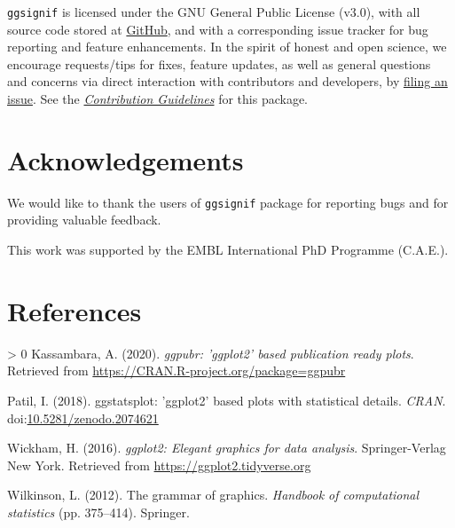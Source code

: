 \documentclass{article}
\newlength{\cslhangindent}
\newenvironment{CSLReferences}[3] %
 {%
  \setlength{\parindent}{0pt}
  \ifodd #1 \everypar{\setlength{\hangindent}{\cslhangindent}}\ignorespaces\fi
  \ifnum #2 > 0
  \setlength{\parskip}{#2\baselineskip}
  \fi
 }%
 {}
\begin{document}
\texttt{ggsignif} is licensed under the GNU General Public License
(v3.0), with all source code stored at
\href{https://github.com/const-ae/ggsignif}{GitHub}, and with a
corresponding issue tracker for bug reporting and feature enhancements.
In the spirit of honest and open science, we encourage requests/tips for
fixes, feature updates, as well as general questions and concerns via
direct interaction with contributors and developers, by
\href{https://github.com/const-ae/ggsignif/issues}{filing an issue}. See
the
\href{https://github.com/const-ae/ggsignif/blob/master/CODE_OF_CONDUCT.md}{\emph{Contribution
Guidelines}} for this package.

\hypertarget{acknowledgements}{%
\section{Acknowledgements}\label{acknowledgements}}

We would like to thank the users of \texttt{ggsignif} package for
reporting bugs and for providing valuable feedback.

This work was supported by the EMBL International PhD Programme
(C.A.E.).

\hypertarget{references}{%
\section*{References}\label{references}}

\hypertarget{refs}{}
\begin{CSLReferences}{1}{0}
\leavevmode\hypertarget{ref-Kassambara2020}{}%
Kassambara, A. (2020). \emph{{ggpubr}: '{ggplot2}' based publication
ready plots}. Retrieved from
\url{https://CRAN.R-project.org/package=ggpubr}

\leavevmode\hypertarget{ref-Patil2018}{}%
Patil, I. (2018). {ggstatsplot}: '{ggplot2}' based plots with
statistical details. \emph{CRAN}.
doi:\href{https://doi.org/10.5281/zenodo.2074621}{10.5281/zenodo.2074621}

\leavevmode\hypertarget{ref-Wickham2016}{}%
Wickham, H. (2016). \emph{{ggplot2}: Elegant graphics for data
analysis}. Springer-Verlag New York. Retrieved from
\url{https://ggplot2.tidyverse.org}

\leavevmode\hypertarget{ref-Wilkinson2012}{}%
Wilkinson, L. (2012). The grammar of graphics. \emph{Handbook of
computational statistics} (pp. 375--414). Springer.

\end{CSLReferences}



\end{document}
